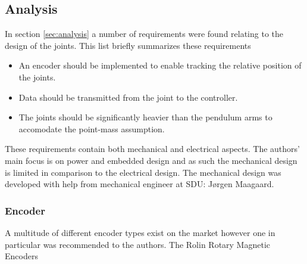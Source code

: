 \subsection{Analysis} %
\label{sub:analysis}

In section \ref{sec:analysis} a number of requirements were found relating to the design of the joints.
This list briefly summarizes these requirements

\begin{itemize}
	\item An encoder should be implemented to enable tracking the relative position of the joints.
	\item Data should be transmitted from the joint to the controller.
	\item The joints should be significantly heavier than the pendulum arms to accomodate the point-mass assumption. 
\end{itemize}

These requirements contain both mechanical and electrical aspects.
The authors' main focus is on power and embedded design and as such the mechanical design is limited in comparison to the electrical design.
The mechanical design was developed with help from mechanical engineer at SDU: Jørgen Maagaard.

\subsubsection{Encoder} %
\label{ssub:encoder}
A multitude of different encoder types exist on the market however one in particular was recommended to the authors.
The Rolin Rotary Magnetic Encoders
